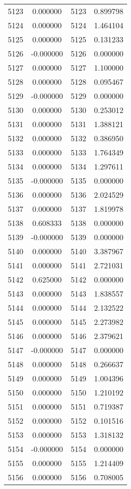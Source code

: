 \documentclass[12pt]{article}
\begin{document}
\begin{longtable}{@{}cccc@{}}
5123 & 0.000000 & 5123 & 0.899798 \\
5124 & 0.000000 & 5124 & 1.464104 \\
5125 & 0.000000 & 5125 & 0.131233 \\
5126 & -0.000000 & 5126 & 0.000000 \\
5127 & 0.000000 & 5127 & 1.100000 \\
5128 & 0.000000 & 5128 & 0.095467 \\
5129 & -0.000000 & 5129 & 0.000000 \\
5130 & 0.000000 & 5130 & 0.253012 \\
5131 & 0.000000 & 5131 & 1.388121 \\
5132 & 0.000000 & 5132 & 0.386950 \\
5133 & 0.000000 & 5133 & 1.764349 \\
5134 & 0.000000 & 5134 & 1.297611 \\
5135 & -0.000000 & 5135 & 0.000000 \\
5136 & 0.000000 & 5136 & 2.024529 \\
5137 & 0.000000 & 5137 & 1.819978 \\
5138 & 0.608333 & 5138 & 0.000000 \\
5139 & -0.000000 & 5139 & 0.000000 \\
5140 & 0.000000 & 5140 & 3.387967 \\
5141 & 0.000000 & 5141 & 2.721031 \\
5142 & 0.625000 & 5142 & 0.000000 \\
5143 & 0.000000 & 5143 & 1.838557 \\
5144 & 0.000000 & 5144 & 2.132522 \\
5145 & 0.000000 & 5145 & 2.273982 \\
5146 & 0.000000 & 5146 & 2.379621 \\
5147 & -0.000000 & 5147 & 0.000000 \\
5148 & 0.000000 & 5148 & 0.266637 \\
5149 & 0.000000 & 5149 & 1.004396 \\
5150 & 0.000000 & 5150 & 1.210192 \\
5151 & 0.000000 & 5151 & 0.719387 \\
5152 & 0.000000 & 5152 & 0.101516 \\
5153 & 0.000000 & 5153 & 1.318132 \\
5154 & -0.000000 & 5154 & 0.000000 \\
5155 & 0.000000 & 5155 & 1.214409 \\
5156 & 0.000000 & 5156 & 0.708005 \\

\end{longtable}
\end{document}
